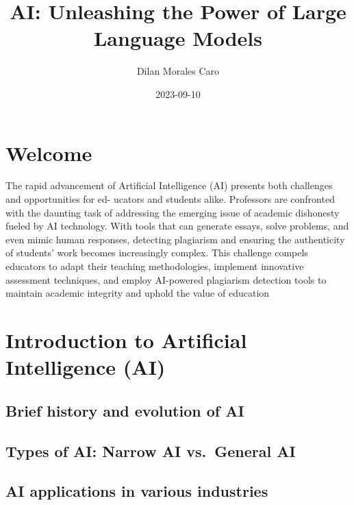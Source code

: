 \documentclass[
]{book}
\title{AI: Unleashing the Power of Large Language Models}
\author{Dilan Morales Caro}
\date{2023-09-10}
\begin{document}
\maketitle

{
\setcounter{tocdepth}{1}
\tableofcontents
}
\hypertarget{welcome}{%
\chapter{Welcome}\label{welcome}}

The rapid advancement of Artificial Intelligence (AI) presents both challenges and opportunities for ed-
ucators and students alike. Professors are confronted with the daunting task of addressing the emerging
issue of academic dishonesty fueled by AI technology. With tools that can generate essays, solve problems,
and even mimic human responses, detecting plagiarism and ensuring the authenticity of students' work
becomes increasingly complex. This challenge compels educators to adapt their teaching methodologies, implement innovative assessment techniques, and employ AI-powered plagiarism detection tools to
maintain academic integrity and uphold the value of education

\hypertarget{introduction-to-artificial-intelligence-ai}{%
\chapter*{Introduction to Artificial Intelligence (AI)}\label{introduction-to-artificial-intelligence-ai}}

\hypertarget{brief-history-and-evolution-of-ai}{%
\section*{Brief history and evolution of AI}\label{brief-history-and-evolution-of-ai}}

\hypertarget{types-of-ai-narrow-ai-vs.-general-ai}{%
\section*{Types of AI: Narrow AI vs.~General AI}\label{types-of-ai-narrow-ai-vs.-general-ai}}

\hypertarget{ai-applications-in-various-industries}{%
\section*{AI applications in various industries}\label{ai-applications-in-various-industries}}
\end{document}
